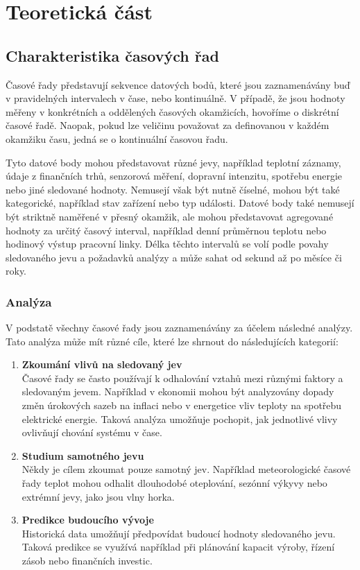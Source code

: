 \chapter{Teoretická část}
\section{Charakteristika časových řad}
Časové řady představují sekvence datových bodů, které jsou zaznamenávány buď v pravidelných intervalech v čase, nebo kontinuálně. 
V případě, že jsou hodnoty měřeny v konkrétních a oddělených časových okamžicích, hovoříme o diskrétní časové řadě.
Naopak, pokud lze veličinu považovat za definovanou v každém okamžiku času, jedná se o kontinuální časovou řadu.

Tyto datové body mohou představovat různé jevy, například teplotní záznamy, údaje z finančních trhů, senzorová měření, dopravní intenzitu, spotřebu energie nebo jiné sledované hodnoty. 
Nemusejí však být nutně číselné, mohou být také kategorické, například stav zařízení nebo typ události.
Datové body také nemusejí být striktně naměřené v přesný okamžik, ale mohou představovat agregované hodnoty za určitý časový interval,
například denní průměrnou teplotu nebo hodinový výstup pracovní linky. Délka těchto intervalů se volí podle povahy sledovaného jevu a požadavků analýzy a může sahat od sekund až po měsíce či roky.
\cite{diggle2025time}

\subsection{Analýza}
V podstatě všechny časové řady jsou zaznamenávány za účelem následné analýzy. Tato analýza může mít různé cíle, které lze shrnout do následujících kategorií:
\begin{enumerate}
  \item \textbf{Zkoumání vlivů na sledovaný jev} \\
  Časové řady se často používají k odhalování vztahů mezi různými faktory a sledovaným jevem. 
  Například v ekonomii mohou být analyzovány dopady změn úrokových sazeb na inflaci nebo v energetice vliv teploty na spotřebu elektrické energie. 
  Taková analýza umožňuje pochopit, jak jednotlivé vlivy ovlivňují chování systému v čase.
  \item \textbf{Studium samotného jevu} \\
  Někdy je cílem zkoumat pouze samotný jev.
  Například meteorologické časové řady teplot mohou odhalit dlouhodobé oteplování, sezónní výkyvy nebo extrémní jevy, jako jsou vlny horka.
  \item \textbf{Predikce budoucího vývoje} \\
  Historická data umožňují předpovídat budoucí hodnoty sledovaného jevu. 
  Taková predikce se využívá například při plánování kapacit výroby, řízení zásob nebo finančních investic.
\end{enumerate} 

